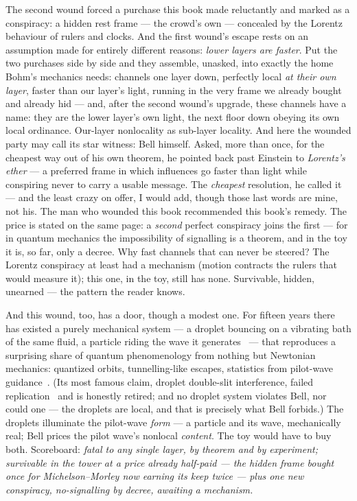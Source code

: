\documentclass[fontsize=11pt,paper=a4,pagesize=auto,parskip=half-]{scrbook}
\begin{document}
The second wound forced a purchase this book made reluctantly and marked as a conspiracy: a hidden rest frame --- the crowd's own --- concealed by the Lorentz behaviour of rulers and clocks. And the first wound's escape rests on an assumption made for entirely different reasons: \emph{lower layers are faster}. Put the two purchases side by side and they assemble, unasked, into exactly the home Bohm's mechanics needs: channels one layer down, perfectly local \emph{at their own layer}, faster than our layer's light, running in the very frame we already bought and already hid --- and, after the second wound's upgrade, these channels have a name: they are the lower layer's own light, the next floor down obeying its own local ordinance. Our-layer nonlocality as sub-layer locality. And here the wounded party may call its star witness: Bell himself. Asked, more than once, for the cheapest way out of his own theorem, he pointed back past Einstein to \emph{Lorentz's ether} --- a preferred frame in which influences go faster than light while conspiring never to carry a usable message. The \emph{cheapest} resolution, he called it~\cite{bell1987} --- and the least crazy on offer, I would add, though those last words are mine, not his. The man who wounded this book recommended this book's remedy. The price is stated on the same page: a \emph{second} perfect conspiracy joins the first --- for in quantum mechanics the impossibility of signalling is a theorem, and in the toy it is, so far, only a decree. Why fast channels that can never be steered? The Lorentz conspiracy at least had a mechanism (motion contracts the rulers that would measure it); this one, in the toy, still has none. Survivable, hidden, unearned --- the pattern the reader knows.

And this wound, too, has a door, though a modest one. For fifteen years there has existed a purely mechanical system --- a droplet bouncing on a vibrating bath of the same fluid, a particle riding the wave it generates~\cite{couder2006} --- that reproduces a surprising share of quantum phenomenology from nothing but Newtonian mechanics: quantized orbits, tunnelling-like escapes, statistics from pilot-wave guidance~\cite{bush2015}. (Its most famous claim, droplet double-slit interference, failed replication~\cite{andersen2015} and is honestly retired; and no droplet system violates Bell, nor could one --- the droplets are local, and that is precisely what Bell forbids.) The droplets illuminate the pilot-wave \emph{form} --- a particle and its wave, mechanically real; Bell prices the pilot wave's nonlocal \emph{content}. The toy would have to buy both. Scoreboard: \emph{fatal to any single layer, by theorem and by experiment; survivable in the tower at a price already half-paid --- the hidden frame bought once for Michelson--Morley now earning its keep twice --- plus one new conspiracy, no-signalling by decree, awaiting a mechanism.}
\end{document}
